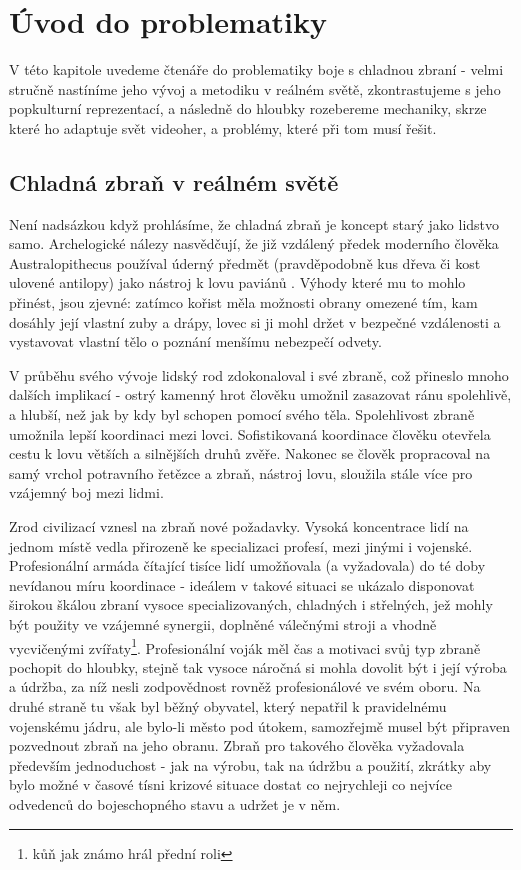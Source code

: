 \chapter{Úvod do problematiky}
V této kapitole uvedeme čtenáře do problematiky boje s chladnou zbraní - velmi stručně nastíníme jeho vývoj a metodiku v reálném světě, zkontrastujeme s jeho popkulturní reprezentací, a následně do hloubky rozebereme mechaniky, skrze které ho adaptuje svět videoher, a problémy, které při tom musí řešit.


\section{Chladná zbraň v reálném světě}
Není nadsázkou když prohlásíme, že chladná zbraň je koncept starý jako lidstvo samo. Archelogické nálezy nasvědčují, že již vzdálený předek moderního člověka Australopithecus používal úderný předmět (pravděpodobně kus dřeva či kost ulovené antilopy) jako nástroj k lovu paviánů \cite{AustralopithecusWeapon}. Výhody které mu to mohlo přinést, jsou zjevné: zatímco kořist měla možnosti obrany omezené tím, kam dosáhly její vlastní zuby a drápy, lovec si ji mohl držet v bezpečné vzdálenosti a vystavovat vlastní tělo o poznání menšímu nebezpečí odvety.

V průběhu svého vývoje lidský rod zdokonaloval i své zbraně, což přineslo mnoho dalších implikací - ostrý kamenný hrot člověku umožnil zasazovat ránu spolehlivě, a hlubší, než jak by kdy byl schopen pomocí svého těla. Spolehlivost zbraně umožnila lepší koordinaci mezi lovci. Sofistikovaná koordinace člověku otevřela cestu k lovu větších a silnějších druhů zvěře. Nakonec se člověk propracoval na samý vrchol potravního řetězce a zbraň, nástroj lovu, sloužila stále více pro vzájemný boj mezi lidmi. 

Zrod civilizací vznesl na zbraň nové požadavky. Vysoká koncentrace lidí na jednom místě vedla přirozeně ke specializaci profesí, mezi jinými i vojenské. Profesionální armáda čítající tisíce lidí umožňovala (a vyžadovala) do té doby nevídanou míru koordinace - ideálem v takové situaci se ukázalo disponovat širokou škálou zbraní vysoce specializovaných, chladných i střelných, jež mohly být použity ve vzájemné synergii, doplněné válečnými stroji a vhodně vycvičenými zvířaty\footnote{kůň jak známo hrál přední roli}. Profesionální voják měl čas a motivaci svůj typ zbraně pochopit do hloubky, stejně tak vysoce náročná si mohla dovolit být i její výroba a údržba, za níž nesli zodpovědnost rovněž profesionálové ve svém oboru. 
Na druhé straně tu však byl běžný obyvatel, který nepatřil k pravidelnému vojenskému jádru, ale bylo-li město pod útokem, samozřejmě musel být připraven pozvednout zbraň na jeho obranu. Zbraň pro takového člověka vyžadovala především jednoduchost - jak na výrobu, tak na údržbu a použití, zkrátky aby bylo možné v časové tísni krizové situace dostat co nejrychleji co nejvíce odvedenců do bojeschopného stavu a udržet je v něm.


